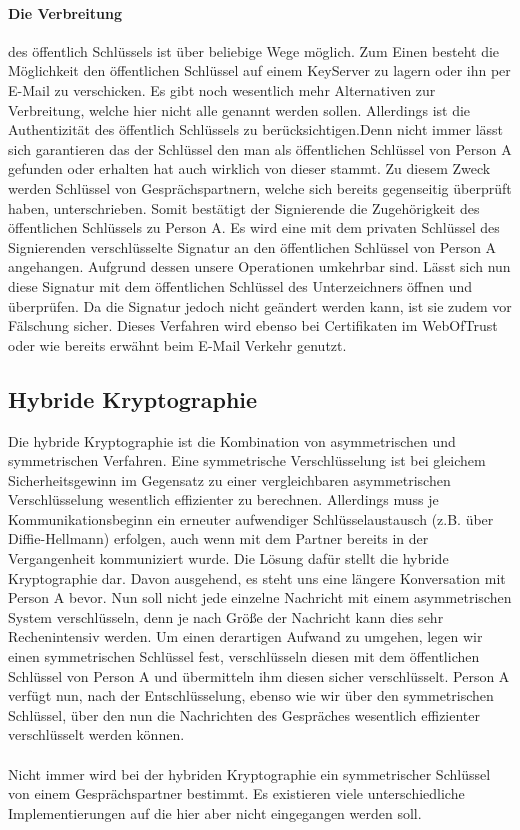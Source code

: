 \documentclass[paper=a4,11pt,german]{scrartcl} %
\begin{document}
\paragraph{Die Verbreitung}
des öffentlich Schlüssels ist über beliebige Wege möglich. Zum Einen besteht die Möglichkeit den öffentlichen Schlüssel auf einem KeyServer zu lagern oder ihn per E-Mail zu verschicken. Es gibt noch wesentlich mehr Alternativen zur Verbreitung, welche hier nicht alle genannt werden sollen. Allerdings ist die Authentizität des öffentlich Schlüssels zu berücksichtigen.Denn nicht immer lässt sich garantieren das der Schlüssel den man als öffentlichen Schlüssel von Person A gefunden oder erhalten hat auch wirklich von dieser stammt. Zu diesem Zweck werden Schlüssel von Gesprächspartnern, welche sich bereits gegenseitig überprüft haben, unterschrieben. Somit bestätigt der Signierende die Zugehörigkeit des öffentlichen Schlüssels zu Person A. Es wird eine mit dem privaten Schlüssel des Signierenden verschlüsselte Signatur an den öffentlichen Schlüssel von Person A angehangen. Aufgrund dessen unsere Operationen umkehrbar sind. Lässt sich nun diese Signatur mit dem öffentlichen Schlüssel des Unterzeichners öffnen und überprüfen. Da die Signatur jedoch nicht geändert werden kann, ist sie zudem vor Fälschung sicher. Dieses Verfahren wird ebenso bei Certifikaten im WebOfTrust oder wie bereits erwähnt beim E-Mail Verkehr genutzt.

\subsection{Hybride Kryptographie}
Die hybride Kryptographie ist die Kombination von asymmetrischen und symmetrischen Verfahren. Eine symmetrische Verschlüsselung ist bei gleichem Sicherheitsgewinn im Gegensatz zu einer vergleichbaren asymmetrischen Verschlüsselung  wesentlich effizienter zu berechnen. Allerdings muss je Kommunikationsbeginn ein erneuter aufwendiger Schlüsselaustausch (z.B. über Diffie-Hellmann) erfolgen, auch wenn mit dem Partner bereits in der Vergangenheit kommuniziert wurde. Die Lösung dafür stellt die hybride Kryptographie dar. Davon ausgehend, es steht uns eine längere Konversation mit Person A bevor. Nun soll nicht jede einzelne Nachricht mit einem asymmetrischen System verschlüsseln, denn je nach Größe der Nachricht kann dies sehr Rechenintensiv werden. Um einen derartigen Aufwand zu umgehen, legen wir einen symmetrischen Schlüssel fest, verschlüsseln diesen mit dem öffentlichen Schlüssel von Person A und übermitteln ihm diesen sicher verschlüsselt. Person A verfügt nun, nach der Entschlüsselung, ebenso wie wir über den symmetrischen Schlüssel, über den nun die Nachrichten des Gespräches wesentlich effizienter verschlüsselt werden können.\\
\ \\
Nicht immer wird bei der hybriden Kryptographie ein symmetrischer Schlüssel von einem Gesprächspartner bestimmt. Es existieren viele unterschiedliche Implementierungen auf die hier aber nicht eingegangen werden soll.
\end{document}
